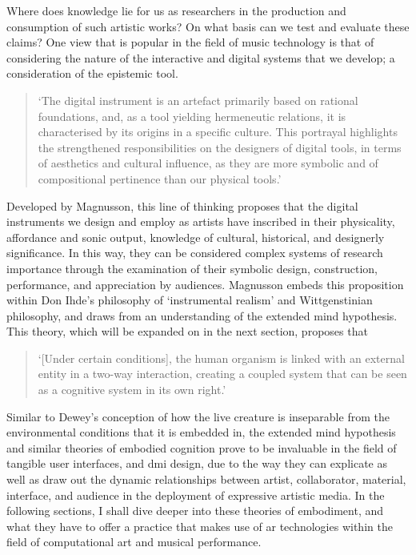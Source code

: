 Where does knowledge lie for us as researchers in the production and consumption of such artistic works? On what basis can we test and evaluate these claims? One view that is popular in the field of music technology is that of considering the nature of the interactive and digital systems that we develop; a consideration of the epistemic tool. 
\begin{quote}
    `The digital instrument is an artefact primarily based on rational foundations, and, as a tool yielding hermeneutic relations, it is characterised by its origins in a specific culture. This portrayal highlights the strengthened responsibilities on the designers of digital tools, in terms of aesthetics and cultural influence, as they are more symbolic and of compositional pertinence than our physical tools.' \citep[p. 335]{magnusson2009a} 
\end{quote}

Developed by Magnusson, this line of thinking proposes that the digital instruments we design and employ as artists have inscribed in their physicality, affordance and sonic output, knowledge of cultural, historical, and designerly significance. In this way, they can be considered complex systems of research importance through the examination of their symbolic design, construction, performance, and appreciation by audiences. Magnusson embeds this proposition within Don Ihde's philosophy of `instrumental realism' and Wittgenstinian philosophy, and draws from an understanding of the extended mind hypothesis. This theory, which will be expanded on in the next section, proposes that 
\begin{quote}
    `[Under certain conditions], the human organism is linked with an external entity in a two-way interaction, creating a coupled system that can be seen as a cognitive system in its own right.' \citep[p. 7]{clark1998}
\end{quote}


Similar to Dewey's conception of how the live creature is inseparable from the environmental conditions that it is embedded in, the extended mind hypothesis and similar theories of embodied cognition prove to be invaluable in the field of tangible user interfaces, and \gls{dmi} design, due to the way they can explicate as well as draw out the dynamic relationships between artist, collaborator, material, interface, and audience in the deployment of expressive artistic media. In the following sections, I shall dive deeper into these theories of embodiment, and what they have to offer a practice that makes use of \gls{ar} technologies within the field of computational art and musical performance.

